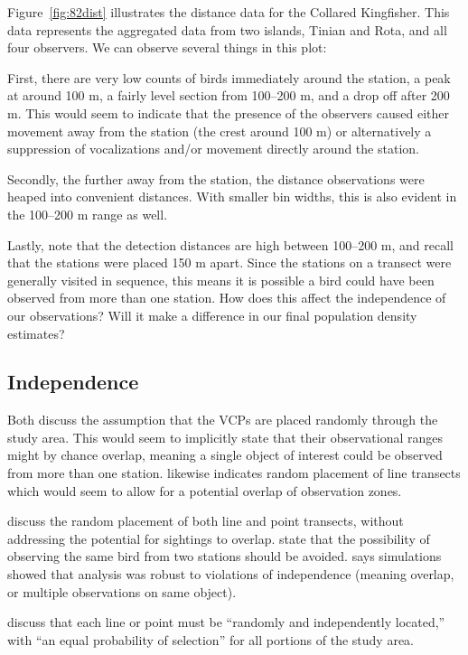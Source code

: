 \documentclass[12pt]{article}
\begin{document}
Figure~\ref{fig:82dist} illustrates the distance data for the Collared Kingfisher. This data represents the aggregated data from two islands, Tinian and Rota, and all four observers. We can observe several things in this plot:

First, there are very low counts of birds immediately around the station, a peak at around 100 m, a fairly level section from 100--200 m, and a drop off after 200 m. This would seem to indicate that the presence of the observers caused either movement away from the station (the crest around 100 m) or alternatively a suppression of vocalizations and/or movement directly around the station. 

Secondly, the further away from the station, the distance observations were heaped into convenient distances. With smaller bin widths, this is also evident in the 100--200 m range as well.

Lastly, note that the detection distances are high between 100--200 m, and recall that the stations were placed 150 m apart. Since the stations on a transect were generally visited in sequence, this means it is possible a bird could have been observed from more than one station. How does this affect the independence of our observations? Will it make a difference in our final population density estimates?

\subsection{Independence}
Both \textcite{ramsey1979,buckland1987} discuss the assumption that the VCPs are placed randomly through the study area. This would seem to implicitly state that their observational ranges might by chance overlap, meaning a single object of interest could be observed from more than one station.  \textcite[240]{thompson2012} likewise indicates random placement of line transects which would seem to allow for a potential overlap of observation zones. 

\textcite{buckland2001} discuss the random placement of both line and point transects, without addressing the potential for sightings to overlap. \textcite{reynolds1980} state that the possibility of observing the same bird from two stations should be avoided. \textcite{buckland2006} says simulations showed that analysis was robust to violations of independence (meaning overlap, or multiple observations on same object).

\textcite[233]{buckland2001} discuss that each line or point must be ``randomly and independently located,'' with ``an equal probability of selection'' for all portions of the study area.
\end{document}
